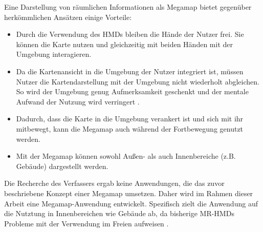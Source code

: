 %

Eine Darstellung von räumlichen Informationen als Megamap bietet gegenüber herkömmlichen Ansätzen einige Vorteile:
\begin{itemize}
    \item Durch die Verwendung des HMDs bleiben die Hände der Nutzer frei. %
    Sie können die Karte nutzen und gleichzeitig mit beiden Händen mit der Umgebung interagieren.

    \item Da die Kartenansicht in die Umgebung der Nutzer integriert ist, müssen Nutzer die Kartendarstellung mit der Umgebung nicht wiederholt abgleichen. %
    So wird der Umgebung genug Aufmerksamkeit geschenkt und der mentale Aufwand der Nutzung wird verringert \parencites[4\psq]{Bark2014}{Narzt2006}{Kim2009}.

    \item Dadurch, dass die Karte in die Umgebung verankert ist und sich mit ihr mitbewegt, kann die Megamap auch während der Fortbewegung genutzt werden.

    \item Mit der Megamap können sowohl Außen- als auch Innenbereiche (z.B. Gebäude) dargestellt werden.
\end{itemize}

Die Recherche des Verfassers ergab keine Anwendungen, die das zuvor beschriebene Konzept einer Megamap umsetzen.
Daher wird im Rahmen dieser Arbeit eine Megamap-Anwendung entwickelt.
Spezifisch zielt die Anwendung auf die Nutztung in Innenbereichen wie Gebäude ab, da bisherige MR-HMDs Probleme mit der Verwendung im Freien aufweisen \parencites{Schroeder2017}{Strange2018}.

